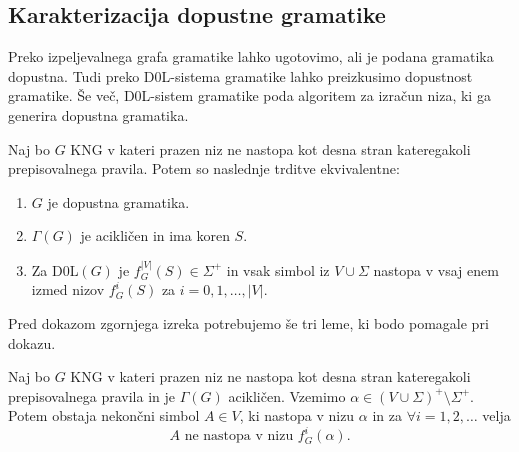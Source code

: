 \documentclass[fin1, tisk]{fmfdelo}
\providecommand{\abs}[1]{\left\lvert #1 \right\rvert}
\theoremstyle{definition}
\begin{document}
\subsection{Karakterizacija dopustne gramatike}

Preko izpeljevalnega grafa gramatike lahko ugotovimo, ali je podana gramatika dopustna. Tudi preko
D$0$L-sistema gramatike lahko preizkusimo dopustnost gramatike. Še več, D$0$L-sistem gramatike
poda algoritem za izračun niza, ki ga generira dopustna gramatika.

\begin{izrek}\label{izrek:ekvivalence}
    Naj bo $G$ KNG v kateri prazen niz ne nastopa kot desna stran 
    kateregakoli prepisovalnega pravila. Potem so naslednje trditve ekvivalentne:
    \begin{enumerate}
        \item $G$ je dopustna gramatika.
        \item $\Gamma(G)$ je acikličen in ima koren $S$.
        \item Za D0L$(G)$ je $ f_G^{\abs{V}}(S) \in \Sigma^+ $ in vsak simbol iz
        $ V \cup \Sigma $ nastopa v vsaj enem izmed nizov $f_G^i(S)$ za $i=0, 1, \ldots, \abs{V}$.
    \end{enumerate}
\end{izrek}

Pred dokazom zgornjega izreka potrebujemo še tri leme, ki bodo pomagale pri dokazu.

\begin{lema}\label{lema:pomožna}
    Naj bo $G$ KNG v kateri prazen niz ne nastopa kot desna stran kateregakoli prepisovalnega 
    pravila in je $\Gamma(G)$ acikličen. Vzemimo $\alpha \in ( V \cup \Sigma)^+ \setminus \Sigma^+$.
    Potem obstaja nekončni simbol $ A \in V $, ki nastopa v nizu $\alpha$ in za $\forall i=1,2,\ldots$
    velja
    \[
        A \text{ ne nastopa v nizu } f^i_G(\alpha).
    \]
\end{lema}
\end{document}
